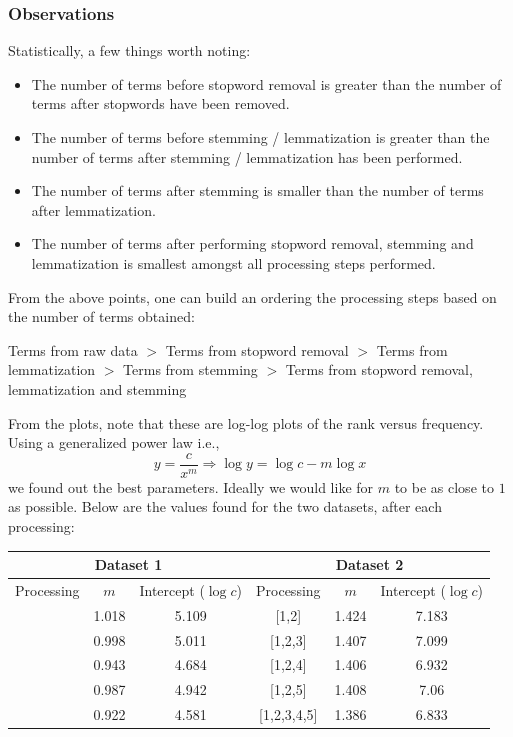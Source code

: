 \documentclass{article}
\begin{document}
\subsubsection{Observations}
\begin{flushleft}
Statistically, a few things worth noting:
\begin{itemize}
\item The number of terms before stopword removal is greater than the number of terms after stopwords have been removed.
\item The number of terms before stemming / lemmatization is greater than the number of terms after stemming / lemmatization has been performed.
\item The number of terms after stemming is smaller than the number of terms after lemmatization.
\item The number of terms after performing stopword removal, stemming and lemmatization is smallest amongst all processing steps performed.
\end{itemize}
From the above points, one can build an ordering the processing steps based on the number of terms obtained:
\begin{center}
Terms from raw data \(>\) Terms from stopword removal \(>\) Terms from lemmatization \(>\) Terms from stemming \(>\) Terms from stopword removal, lemmatization and stemming
\end{center}

From the plots, note that these are log-log plots of the rank versus frequency. Using a generalized power law i.e.,
\begin{equation}
\label{gen-zipf}
y = \frac{c}{x^{m}} \Rightarrow \log y = \log c - m \log x
\end{equation}
we found out the best parameters. Ideally we would like for \(m\) to be as close to \(1\) as possible. Below are the values found for the two datasets, after each processing:
\begin{center}
\begin{tabular}{|c|c|c|c|c|c|}
\hline
\multicolumn{3}{|c|}{Dataset 1} & \multicolumn{3}{|c|}{Dataset 2}\\
\hline
Processing & \(m\) & Intercept (\(\log c\)) & Processing & \(m\) & Intercept (\(\log c\))\\
\hline
\hline
[1,2] & 1.018 & 5.109 & [1,2] & 1.424 & 7.183\\
\hline
[1,2,3] & 0.998 & 5.011 & [1,2,3] & 1.407 & 7.099\\
\hline
[1,2,4] & 0.943 & 4.684 & [1,2,4] & 1.406 & 6.932\\
\hline
[1,2,5] & 0.987 & 4.942 & [1,2,5] & 1.408 & 7.06\\
\hline
[1,2,3,4,5] & 0.922 & 4.581 & [1,2,3,4,5] & 1.386 & 6.833\\
\hline
\end{tabular}
\end{center}


\end{flushleft}
\end{document}
